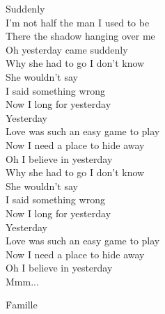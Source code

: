 \documentclass{novel}
\begin{document}
Suddenly\\
I'm not half the man I used to be\\
There the shadow hanging over me\\
Oh yesterday came suddenly\\

Why she had to go I don't know\\
She wouldn't say\\
I said something wrong\\
Now I long for yesterday\\

Yesterday\\
Love was such an easy game to play\\
Now I need a place to hide away\\
Oh I believe in yesterday\\

Why she had to go I don't know\\
She wouldn't say\\
I said something wrong\\
Now I long for yesterday\\

Yesterday\\
Love was such an easy game to play\\
Now I need a place to hide away\\
Oh I believe in yesterday\\

Mmm...

\newpage
\normalsize
\h*{Famille}
\end{document}
